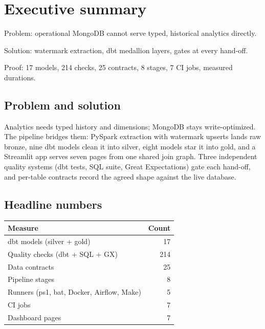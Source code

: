 \chapter{Executive summary}

\begin{glance}
\item Problem: operational MongoDB cannot serve typed, historical analytics directly.
\item Solution: watermark extraction, dbt medallion layers, gates at every hand-off.
\item Proof: 17 models, 214 checks, 25 contracts, 8 stages, 7 CI jobs, measured durations.
\end{glance}

\section{Problem and solution}

Analytics needs typed history and dimensions; MongoDB stays write-optimized. The pipeline bridges them: PySpark extraction with watermark upserts lands raw bronze, nine dbt models clean it into silver, eight models star it into gold, and a Streamlit app serves seven pages from one shared join graph. Three independent quality systems (dbt tests, SQL suite, Great Expectations) gate each hand-off, and per-table contracts record the agreed shape against the live database.

\section{Headline numbers}

\begin{center}
\begin{tabular}{lr}
\toprule
Measure & Count \\
\midrule
dbt models (silver + gold) & 17 \\
Quality checks (dbt + SQL + GX) & 214 \\
Data contracts & 25 \\
Pipeline stages & 8 \\
Runners (ps1, bat, Docker, Airflow, Make) & 5 \\
CI jobs & 7 \\
Dashboard pages & 7 \\
\bottomrule
\end{tabular}
\label{tab:headlines}
\end{center}

